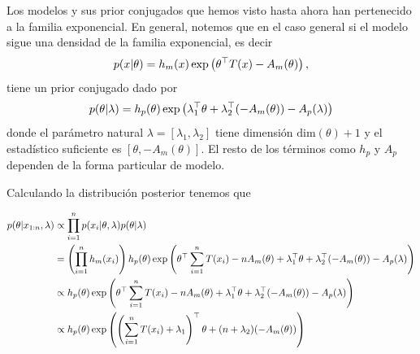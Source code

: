 Los modelos y sus prior conjugados que hemos visto hasta ahora han pertenecido a la familia exponencial. En general, notemos que en el caso general si el modelo sigue una densidad de la familia exponencial, es decir
\begin{equation}
	p(x|\theta) = h_m(x)\exp\left(\theta^\top T(x)-A_m(\theta)\right),
\end{equation}
tiene un prior conjugado dado por 
\begin{equation}
	p(\theta|\lambda) = h_p(\theta)\exp\left(\lambda_1^\top \theta + \lambda_2^\top(-A_m(\theta)) -A_p(\lambda)\right)
\end{equation}
donde el parámetro natural $\lambda = [\lambda_1, \lambda_2]$ tiene dimensión $\text{dim}(\theta) +1 $ y el estadístico suficiente es $[\theta, -A_m(\theta)]$. El resto de los términos como $h_p$ y $A_p$ dependen de la forma particular de modelo. 

Calculando la distribución posterior tenemos que 

\begin{align}
	p(\theta|x_{1:n},\lambda) 
	&\propto \prod_{i=1}^np(x_i|\theta,\lambda)p(\theta|\lambda)\\
	&=\left(\prod_{i=1}^n h_m(x_i)\right) h_p(\theta) \exp\left(\theta^\top \sum_{i=1}^nT(x_i)-nA_m(\theta)+\lambda_1^\top \theta + \lambda_2^\top(-A_m(\theta)) -A_p(\lambda)\right)\nonumber\\
	&\propto h_p(\theta) \exp\left(\theta^\top \sum_{i=1}^nT(x_i)-nA_m(\theta)+\lambda_1^\top \theta + \lambda_2^\top(-A_m(\theta)) -A_p(\lambda)\right)\nonumber\\
	&\propto h_p(\theta) \exp\left(\left(\sum_{i=1}^nT(x_i)+\lambda_1\right)^\top\theta + (n+\lambda_2)(-A_m(\theta))\right)\nonumber
\end{align}


